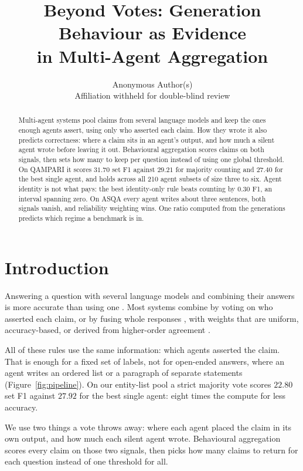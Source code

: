 \documentclass{article}
\title{Beyond Votes: Generation Behaviour as Evidence\\
in Multi-Agent Aggregation}
\author{%
  Anonymous Author(s) \\
  Affiliation withheld for double-blind review \\
}
\begin{document}
\maketitle


\begin{abstract}
  Multi-agent systems pool claims from several language models and keep the ones enough agents assert, using only who asserted each claim. How they wrote it also predicts correctness: where a claim sits in an agent's output, and how much a silent agent wrote before leaving it out. Behavioural aggregation scores claims on both signals, then sets how many to keep per question instead of using one global threshold. On QAMPARI it scores $31.70$ set F1 against $29.21$ for majority counting and $27.40$ for the best single agent, and holds across all 210 agent subsets of size three to six. Agent identity is not what pays: the best identity-only rule beats counting by $0.30$ F1, an interval spanning zero. On ASQA every agent writes about three sentences, both signals vanish, and reliability weighting wins. One ratio computed from the generations predicts which regime a benchmark is in.
\end{abstract}


\section{Introduction}
\label{sec:intro}

Answering a question with several language models and combining their answers is more accurate than using one \cite{li2024agents}. Most systems combine by voting on who asserted each claim, or by fusing whole responses \cite{jiang2023llm}, with weights that are uniform, accuracy-based, or derived from higher-order agreement \cite{ai2025majority}.

All of these rules use the same information: which agents asserted the claim. That is enough for a fixed set of labels, not for open-ended answers, where an agent writes an ordered list or a paragraph of separate statements (Figure~\ref{fig:pipeline}). On our entity-list pool a strict majority vote scores $22.80$ set F1 against $27.92$ for the best single agent: eight times the compute for less accuracy. %

We use two things a vote throws away: where each agent placed the claim in its own output, and how much each silent agent wrote. Behavioural aggregation scores every claim on those two signals, then picks how many claims to return for each question instead of one threshold for all.
\end{document}
